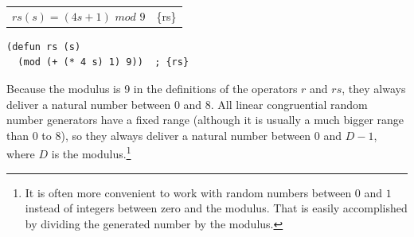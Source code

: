 \begin{center}
\begin{tabular}{ll}
$rs(s) = (4s + 1)$ $mod$ $9$ & \{rs\}\\
\end{tabular}
\end{center}

\begin{Verbatim}
(defun rs (s)
  (mod (+ (* 4 s) 1) 9))  ; {rs}
\end{Verbatim}

Because the modulus is 9 in the definitions of the operators 
$r$ and $rs$, they always deliver a natural number between 0 and 8. 
All linear congruential random number generators
have a fixed range (although it is usually a much bigger range than 0 to 8),
so they always deliver
a natural number between 0 and $D-1$, where $D$ is the modulus.\footnote{It
is often more convenient to work with random numbers between $0$ and $1$
instead of integers between zero and the modulus.
That is easily accomplished by dividing the generated number
by the modulus.}


